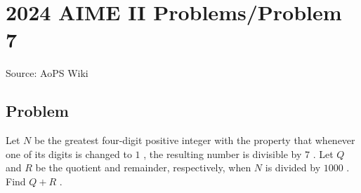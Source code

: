 \documentclass[12pt]{article}
\begin{document}
\section*{{2024 AIME II Problems/Problem 7}}
Source: AoPS Wiki

\subsection*{Problem}
Let $N$ be the greatest four-digit positive integer with the property that whenever one of its digits is changed to $1$ , the resulting number is divisible by $7$ . Let $Q$ and $R$ be the quotient and remainder, respectively, when $N$ is divided by $1000$ . Find $Q+R$ .
\end{document}
